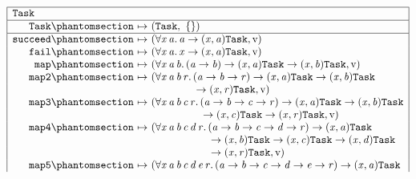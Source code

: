 \begin{figure}[htbp]
\centering
\small
\[
\begin{array}{|r@{\ }c@{\ }l|}
\hline
\multicolumn{3}{|l|}{\kw{Task}}\\
\hline
\kw{Task}\citelabel{b:Task.Task} & \mapsto & (\sbtTask,\ \emptymap)\\
\hline
\kw{succeed}\citelabel{b:Task.succeed} & \mapsto & (\forall\mv{x}\,\mv{a}.\,\mv{a} \rightarrow (\mv{x}, \mv{a})\sbtTask, \isv)\\
\kw{fail}\citelabel{b:Task.fail} & \mapsto & (\forall\mv{x}\,\mv{a}.\,\mv{x} \rightarrow (\mv{x}, \mv{a})\sbtTask, \isv)\\
\kw{map}\citelabel{b:Task.map} & \mapsto & (\forall\mv{x}\,\mv{a}\,\mv{b}.\,(\mv{a} \rightarrow \mv{b}) \rightarrow (\mv{x}, \mv{a})\sbtTask \rightarrow (\mv{x}, \mv{b})\sbtTask, \isv)\\
\kw{map2}\citelabel{b:Task.map2} & \mapsto & (\forall\mv{x}\,\mv{a}\,\mv{b}\,\mv{r}.\,(\mv{a} \rightarrow \mv{b} \rightarrow \mv{r}) \rightarrow (\mv{x}, \mv{a})\sbtTask \rightarrow (\mv{x}, \mv{b})\sbtTask\\
 & & \phantom{(\forall\mv{x}\,\mv{a}\,\mv{b}\,\mv{r}.\,}{} \rightarrow (\mv{x}, \mv{r})\sbtTask, \isv)\\
\kw{map3}\citelabel{b:Task.map3} & \mapsto & (\forall\mv{x}\,\mv{a}\,\mv{b}\,\mv{c}\,\mv{r}.\,(\mv{a} \rightarrow \mv{b} \rightarrow \mv{c} \rightarrow \mv{r}) \rightarrow (\mv{x}, \mv{a})\sbtTask \rightarrow (\mv{x}, \mv{b})\sbtTask\\
 & & \phantom{(\forall\mv{x}\,\mv{a}\,\mv{b}\,\mv{c}\,\mv{r}.\,}{} \rightarrow (\mv{x}, \mv{c})\sbtTask \rightarrow (\mv{x}, \mv{r})\sbtTask, \isv)\\
\kw{map4}\citelabel{b:Task.map4} & \mapsto & (\forall\mv{x}\,\mv{a}\,\mv{b}\,\mv{c}\,\mv{d}\,\mv{r}.\,(\mv{a} \rightarrow \mv{b} \rightarrow \mv{c} \rightarrow \mv{d} \rightarrow \mv{r}) \rightarrow (\mv{x}, \mv{a})\sbtTask\\
 & & \phantom{(\forall\mv{x}\,\mv{a}\,\mv{b}\,\mv{c}\,\mv{d}\,\mv{r}.\,}{} \rightarrow (\mv{x}, \mv{b})\sbtTask \rightarrow (\mv{x}, \mv{c})\sbtTask \rightarrow (\mv{x}, \mv{d})\sbtTask\\
 & & \phantom{(\forall\mv{x}\,\mv{a}\,\mv{b}\,\mv{c}\,\mv{d}\,\mv{r}.\,}{} \rightarrow (\mv{x}, \mv{r})\sbtTask, \isv)\\
\kw{map5}\citelabel{b:Task.map5} & \mapsto & (\forall\mv{x}\,\mv{a}\,\mv{b}\,\mv{c}\,\mv{d}\,\mv{e}\,\mv{r}.\,(\mv{a} \rightarrow \mv{b} \rightarrow \mv{c} \rightarrow \mv{d} \rightarrow \mv{e} \rightarrow \mv{r}) \rightarrow (\mv{x}, \mv{a})\sbtTask\\

\end{array}\]
\end{figure}
